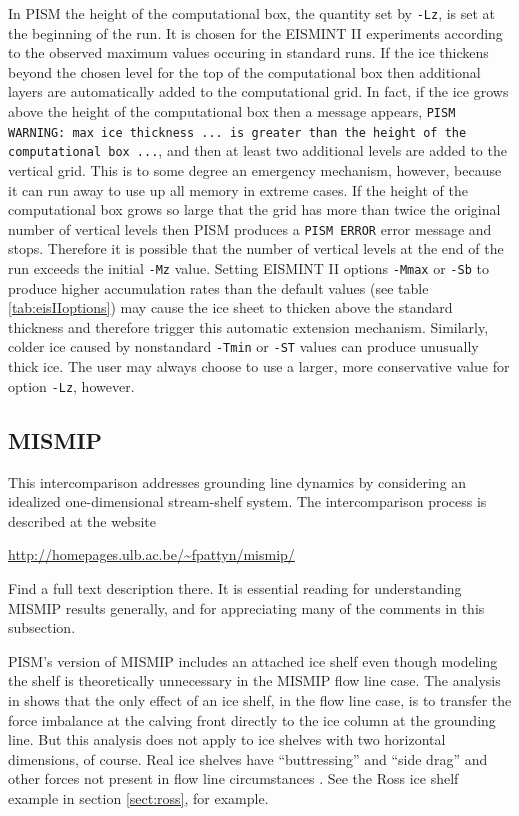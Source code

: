 \documentclass[11pt,final]{amsart}
\begin{document}
In PISM the height of the computational box, the quantity set by \verb|-Lz|, is set at the beginning of the run.  It is chosen for the EISMINT II experiments according to the observed maximum values occuring in standard runs.  If the ice thickens beyond the chosen level for the top of the computational box then additional layers are automatically added to the computational grid.  In fact, if the ice grows above the height of the computational box then a message appears, \texttt{PISM WARNING: max ice thickness ... is greater than the height of the computational box ...}, and then at least two additional levels are added to the vertical grid.  This is to some degree an emergency mechanism, however, because it can run away to use up all memory in extreme cases.  If the height of the computational box grows so large that the grid has more than twice the original number of vertical levels then PISM produces a \texttt{PISM ERROR} error message and stops.   Therefore it is possible that the number of vertical levels at the end of the run exceeds the initial \verb|-Mz| value.  Setting EISMINT II options \verb|-Mmax| or \verb|-Sb| to produce higher accumulation rates than the default values (see table \ref{tab:eisIIoptions}) may cause the ice sheet to thicken above the standard thickness and therefore trigger this automatic extension mechanism.  Similarly, colder ice caused by nonstandard \verb|-Tmin| or \verb|-ST| values can produce unusually thick ice.  The user may always choose to use a larger, more conservative value for option \verb|-Lz|, however.


\subsection{MISMIP}\label{subsect:MISMIP}  This intercomparison addresses grounding line dynamics by considering an idealized one-dimensional stream-shelf system.  The intercomparison process is described at the website

\centerline{\url{http://homepages.ulb.ac.be/~fpattyn/mismip/}}

\noindent Find a full text description there.  It is essential reading for understanding MISMIP results generally, and for appreciating many of the comments in this subsection.

PISM's version of MISMIP includes an attached ice shelf even though modeling the shelf is theoretically unnecessary in the MISMIP flow line case.  The analysis in \cite{SchoofMarine1} shows that the only effect of an ice shelf, in the flow line case, is to transfer the force imbalance at the calving front directly to the ice column at the grounding line.  But this analysis does not apply to ice shelves with two horizontal dimensions, of course.  Real ice shelves have ``buttressing'' and ``side drag'' and other forces not present in flow line circumstances \cite{Goldbergetal2009}.  See the Ross ice shelf example in section \ref{sect:ross}, for example.
\end{document}
